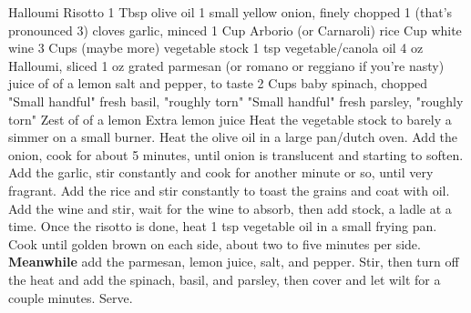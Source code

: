 \documentclass[12pt]{cookbook}
\begin{document}
\begin{recipe}{Halloumi Risotto}
\ingredients
{1 Tbsp olive oil}
{1 small yellow onion, finely chopped}
{1 (that's pronounced 3) cloves garlic, minced}
{1 Cup Arborio (or Carnaroli) rice}
{ Cup white wine}
{3 Cups (maybe more) vegetable stock}
{1 tsp vegetable/canola oil}
{4 oz Halloumi, sliced}
{1 oz grated parmesan (or romano or reggiano if you're nasty)}
{juice of  of a lemon}
{salt and pepper, to taste}
{2 Cups baby spinach, chopped}
{"Small handful" fresh basil, "roughly torn"}
{"Small handful" fresh parsley, "roughly torn"}
{Zest of  of a lemon}
{Extra lemon juice}
\stopingredients
\preparation
{Heat the vegetable stock to barely a simmer on a small burner.}
{Heat the olive oil in a large pan/dutch oven. Add the onion, cook for about 5 minutes, until onion is translucent and starting to soften.}
{Add the garlic, stir constantly and cook for another minute or so, until very fragrant.}
{Add the rice and stir constantly to toast the grains and coat with oil.}
{Add the wine and stir, wait for the wine to absorb, then add stock, a ladle at a time.}
{Once the risotto is done, heat 1 tsp vegetable oil in a small frying pan. Cook until golden brown on each side, about two to five minutes per side.}
{\textbf{Meanwhile} add the parmesan, lemon juice, salt, and pepper. Stir, then turn off the heat and add the spinach, basil, and parsley, then cover and let wilt for a couple minutes.}
{Serve.}
\stopprep
\end{recipe}
\end{document}
